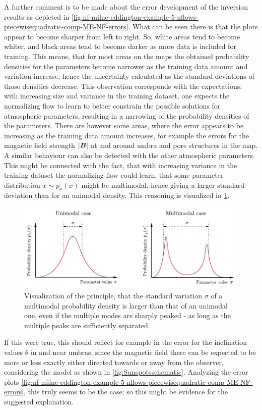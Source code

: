 \documentclass[a4paper,12pt]{report}
\def\lk#1{{\color{black}{#1}}}
\begin{document}
A further comment is to be made about the error development of the inversion results as depicted in \cref{fig:nf-milne-eddington-example-5-nflows-piecewisequadratic-comp-ME-NF-errors}. What can be seen there is that the plots appear to become sharper from left to right. So, white areas tend to become whiter, and black areas tend to become darker as more data is included for training. This means, that for most areas on the maps the obtained probability densities for the parameters become narrower as the training data amount and variation increase, hence the uncertainty calculated as the standard deviations of those densities decrease. This observation corresponds with the expectations; with increasing size and variance in the training dataset, one expects the normalizing flow to learn to better constrain the possible solutions for atmospheric parameters, resulting in a narrowing of the probability densities of the parameters. There are however some areas, where the error appears to be increasing as the training data amount increases, for example the errors for the magnetic field strength $|\bm{B}|$ at and around umbra and pore structures in the map. A similar behaviour can also be detected with the other atmospheric parameters. This might be connected with the fact, that with increasing variance in the training dataset the normalizing flow could learn, that some parameter distribution $x \sim p_x(x)$ might be multimodal, hence giving a larger standard deviation than for an unimodal density. This reasoning is visualized in \cref{fig:unimodal_multimodal}.
\begin{figure}[h!] %
\centering
\includegraphics[width=\textwidth-3cm]{figures/unimodal_multimodal.pdf}
\caption{Visualization of the principle, that the standard variation $\sigma$ of a multimodal probability density is larger than that of an unimodal one, even if the multiple modes are sharply peaked - as long as the multiple peaks are sufficiently separated.}
\label{fig:unimodal_multimodal}
\end{figure}
If this were true, this should reflect for example in the error for the inclination values $\theta$ in and near umbras, since the magnetic field there can be expected to be more or less exactly either directed towards or away from the observer, considering the \lk{sunspot} model as shown in \cref{fig:Sunspotsschematic}. Analyzing the error plots \cref{fig:nf-milne-eddington-example-5-nflows-piecewisequadratic-comp-ME-NF-errors}, this truly seems to be the case; so this might be evidence for the suggested explanation.
\end{document}
